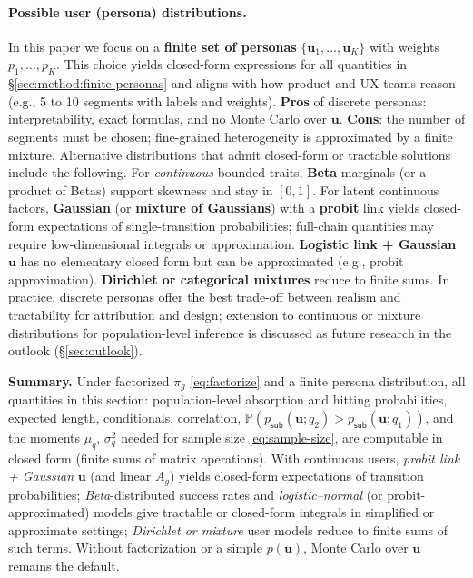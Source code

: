 \paragraph{Possible user (persona) distributions.}
\label{sec:method:persona-distributions}
In this paper we focus on a \textbf{finite set of personas} $\{\mathbf{u}_1, \ldots, \mathbf{u}_K\}$ with weights $p_1, \ldots, p_K$. This choice yields closed-form expressions for all quantities in \S\ref{sec:method:finite-personas} and aligns with how product and UX teams reason (e.g., 5 to 10 segments with labels and weights). \textbf{Pros} of discrete personas: interpretability, exact formulas, and no Monte Carlo over $\mathbf{u}$. \textbf{Cons}: the number of segments must be chosen; fine-grained heterogeneity is approximated by a finite mixture. Alternative distributions that admit closed-form or tractable solutions include the following. For \emph{continuous} bounded traits, \textbf{Beta} marginals (or a product of Betas) support skewness and stay in $[0,1]$. For latent continuous factors, \textbf{Gaussian} (or \textbf{mixture of Gaussians}) with a \textbf{probit} link yields closed-form expectations of single-transition probabilities; full-chain quantities may require low-dimensional integrals or approximation. \textbf{Logistic link + Gaussian} $\mathbf{u}$ has no elementary closed form but can be approximated (e.g., probit approximation). \textbf{Dirichlet or categorical mixtures} reduce to finite sums. In practice, discrete personas offer the best trade-off between realism and tractability for attribution and design; extension to continuous or mixture distributions for population-level inference is discussed as future research in the outlook (\S\ref{sec:outlook}).

\textbf{Summary.} Under factorized $\pi_g$ \eqref{eq:factorize} and a finite persona distribution, all quantities in this section: population-level absorption and hitting probabilities, expected length, conditionals, correlation, $\mathbb{P}(p_{\mathsf{sub}}(\mathbf{u}; q_2) > p_{\mathsf{sub}}(\mathbf{u}; q_1))$, and the moments $\mu_q$, $\sigma_q^2$ needed for sample size \eqref{eq:sample-size}, are computable in closed form (finite sums of matrix operations). With continuous users, \emph{probit link + Gaussian} $\mathbf{u}$ (and linear $A_g$) yields closed-form expectations of transition probabilities; \emph{Beta}-distributed success rates and \emph{logistic–normal} (or probit-approximated) models give tractable or closed-form integrals in simplified or approximate settings; \emph{Dirichlet or mixture} user models reduce to finite sums of such terms. Without factorization or a simple $p(\mathbf{u})$, Monte Carlo over $\mathbf{u}$ remains the default.

